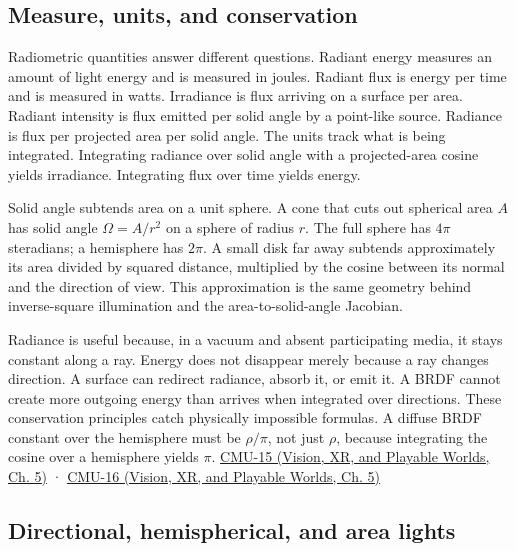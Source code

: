 \subsection{Measure, units, and conservation}\label{03-visual-computing-i-ch004-measure-units-and-conservation}

\hypertarget{03-visual-computing-i-ch004-measure-units-and-conservation}{}

Radiometric quantities answer different questions. Radiant energy measures an amount of light energy and is measured in joules. Radiant flux is energy per time and is measured in watts. Irradiance is flux arriving on a surface per area. Radiant intensity is flux emitted per solid angle by a point-like source. Radiance is flux per projected area per solid angle. The units track what is being integrated. Integrating radiance over solid angle with a projected-area cosine yields irradiance. Integrating flux over time yields energy.

Solid angle subtends area on a unit sphere. A cone that cuts out spherical area \(A\) has solid angle \(\Omega=A/r^2\) on a sphere of radius \(r\). The full sphere has \(4\pi\) steradians; a hemisphere has \(2\pi\). A small disk far away subtends approximately its area divided by squared distance, multiplied by the cosine between its normal and the direction of view. This approximation is the same geometry behind inverse-square illumination and the area-to-solid-angle Jacobian.

Radiance is useful because, in a vacuum and absent participating media, it stays constant along a ray. Energy does not disappear merely because a ray changes direction. A surface can redirect radiance, absorb it, or emit it. A BRDF cannot create more outgoing energy than arrives when integrated over directions. These conservation principles catch physically impossible formulas. A diffuse BRDF constant over the hemisphere must be \(\rho/\pi\), not just \(\rho\), because integrating the cosine over a hemisphere yields \(\pi\). \href{../07-Vision-XR-and-Playable-Worlds/main.pdf\#nameddest=04-visual-computing-ii-ch036-cmu-15---radiometry}{CMU-15 (Vision, XR, and Playable Worlds, Ch. 5)} · \href{../07-Vision-XR-and-Playable-Worlds/main.pdf\#nameddest=04-visual-computing-ii-ch036-cmu-16---the-rendering-equation}{CMU-16 (Vision, XR, and Playable Worlds, Ch. 5)}

\subsection{Directional, hemispherical, and area lights}\label{03-visual-computing-i-ch004-directional-hemispherical-and-area-lights}


